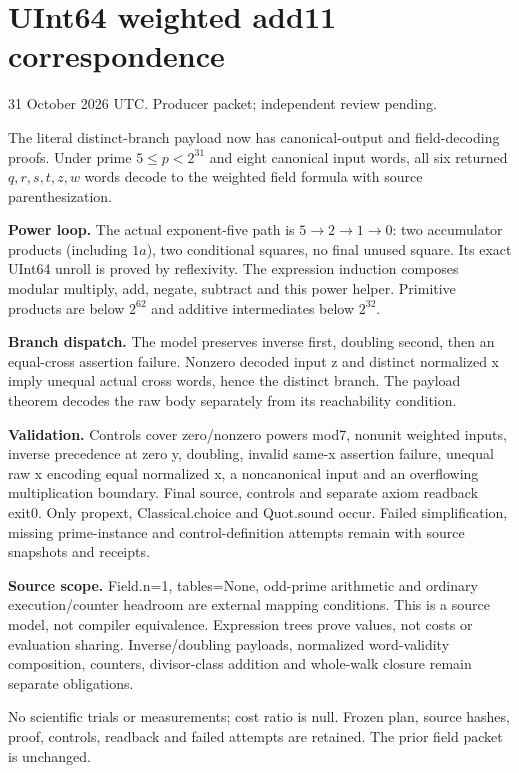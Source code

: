 \documentclass[11pt]{article}
\begin{document}
\section*{UInt64 weighted add11 correspondence}
31 October 2026 UTC. Producer packet; independent review pending.

The literal distinct-branch payload now has canonical-output and field-decoding proofs. Under prime $5\le p<2^{31}$ and eight canonical input words, all six returned $q,r,s,t,z,w$ words decode to the weighted field formula with source parenthesization.

\textbf{Power loop.} The actual exponent-five path is $5\to2\to1\to0$: two accumulator products (including $1a$), two conditional squares, no final unused square. Its exact UInt64 unroll is proved by reflexivity. The expression induction composes modular multiply, add, negate, subtract and this power helper. Primitive products are below $2^{62}$ and additive intermediates below $2^{32}$.

\textbf{Branch dispatch.} The model preserves inverse first, doubling second, then an equal-cross assertion failure. Nonzero decoded input z and distinct normalized x imply unequal actual cross words, hence the distinct branch. The payload theorem decodes the raw body separately from its reachability condition.

\textbf{Validation.} Controls cover zero/nonzero powers mod7, nonunit weighted inputs, inverse precedence at zero y, doubling, invalid same-x assertion failure, unequal raw x encoding equal normalized x, a noncanonical input and an overflowing multiplication boundary. Final source, controls and separate axiom readback exit0. Only propext, Classical.choice and Quot.sound occur. Failed simplification, missing prime-instance and control-definition attempts remain with source snapshots and receipts.

\textbf{Source scope.} Field.n=1, tables=None, odd-prime arithmetic and ordinary execution/counter headroom are external mapping conditions. This is a source model, not compiler equivalence. Expression trees prove values, not costs or evaluation sharing. Inverse/doubling payloads, normalized word-validity composition, counters, divisor-class addition and whole-walk closure remain separate obligations.

No scientific trials or measurements; cost ratio is null. Frozen plan, source hashes, proof, controls, readback and failed attempts are retained. The prior field packet is unchanged.
\end{document}
